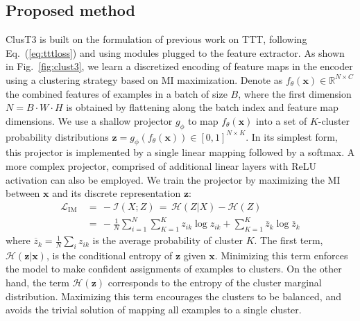 \documentclass{article}
\newcommand{\zz}{\mathbf{z}}
\newcommand{\xx}{\mathbf{x}}
\newcommand{\mr}[1]{\mathrm{#1}}
\begin{document}
\subsection{Proposed method}
\label{subseq:method}

ClusT3 is built on the formulation of previous work on TTT, following Eq.~(\ref{eq:tttloss}) and using modules plugged to the feature extractor. As shown in Fig.~\ref{fig:clust3}, we learn a discretized encoding of feature maps in the encoder using a clustering strategy based on MI maximization. Denote as $f_{\theta}(\xx)\!\in\!\mathbb{R}^{N \times C}$ the combined features of examples in a batch of size $B$, where the first dimension $N\!=\!B\!\cdot\!W\!\cdot\!H$ is obtained by flattening along the batch index and feature map dimensions. We use a shallow projector $g_{\phi}$ to map $f_{\theta}(\xx)$ into a set of $K$-cluster probability distributions $\zz = g_{\phi}(f_{\theta}(\xx))\!\in\![0,1]^{N\!\times\!K}$. In its simplest form, this projector is implemented by a single linear mapping followed by a softmax. A more complex projector, comprised of additional linear layers with ReLU activation can also be employed. We train the projector by maximizing the MI between $\xx$ and its discrete representation $\zz$:
\begin{align}
\label{eq:im}
\mathcal{L}_{\mr{IM}} & \, = \, -\mathcal{I}(X; Z) \, = \, 
\mathcal{H}(Z|X) - \mathcal{H}(Z) \\
 & \, = \, -\frac{1}{N}\sum_{i=1}^{N}\sum_{K\!=\!1}^{K}z_{ik}\log{z_{ik}} + \sum_{K\!=\!1}^{K}\overline{z}_{k}\log\overline{z}_{k}\nonumber
\end{align}
where $\overline{z}_k\!=\!\frac{1}{N}\sum_i z_{ik}$ is the average probability of cluster $K$. The first term, $\mathcal{H}(\zz|\xx)$, is the conditional entropy of $\zz$ given $\xx$. Minimizing this term enforces the model to make confident assignments of examples to clusters. On the other hand, the term $\mathcal{H}(\zz)$ corresponds to the entropy of the cluster marginal distribution. Maximizing this term encourages the clusters to be balanced, and avoids the trivial solution of mapping all examples to a single cluster. 
\end{document}
